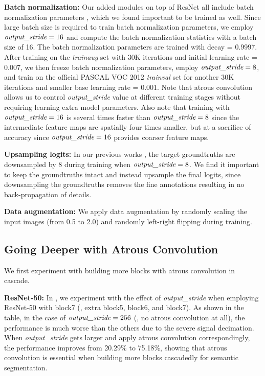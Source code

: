 \textbf{Batch normalization:} Our added modules on top of ResNet all include batch normalization parameters \cite{ioffe2015batch}, which we found important to be trained as well. Since large batch size is required to train batch normalization parameters, we employ $\emph{output\_stride}=16$ and compute the batch normalization statistics with a batch size of 16.
The batch normalization parameters are trained with decay = 0.9997. After training on the \textit{trainaug} set with 30K iterations and initial learning rate = 0.007, we then freeze batch normalization parameters, employ $\emph{output\_stride}=8$, and train on the official PASCAL VOC 2012 \textit{trainval} set for another 30K iterations and smaller base learning rate = 0.001. Note that atrous convolution allows us to control \emph{output\_stride} value at different training stages without requiring learning extra model parameters. Also note that training with $\emph{output\_stride}=16$ is several times faster than $\emph{output\_stride}=8$ since the intermediate feature maps are spatially four times smaller, but at a sacrifice of accuracy since $\emph{output\_stride}=16$ provides coarser feature maps.

\textbf{Upsampling logits:} In our previous works \cite{chen2014semantic, chen2016deeplab}, the target groundtruths are downsampled by 8 during training when $\emph{output\_stride}=8$. We find it important to keep the groundtruths intact and instead upsample the final logits, since downsampling the groundtruths removes the fine annotations resulting in no back-propagation of details.

\textbf{Data augmentation:} We apply data augmentation by randomly scaling the input images (from 0.5 to 2.0) and randomly left-right flipping during training.

\subsection{Going Deeper with Atrous Convolution}
We first experiment with building more blocks with atrous convolution in cascade.

\textbf{ResNet-50:} In , we experiment with the effect of \emph{output\_stride} when employing ResNet-50 with block7 (\ie, extra block5, block6, and block7). As shown in the table, in the case of $\emph{output\_stride}=256$ (\ie, no atrous convolution at all), the performance is much worse than the others due to the severe signal decimation. When \emph{output\_stride} gets larger and apply atrous convolution correspondingly, the performance improves from 20.29\% to 75.18\%, showing that atrous convolution is essential when building more blocks cascadedly for semantic segmentation.

